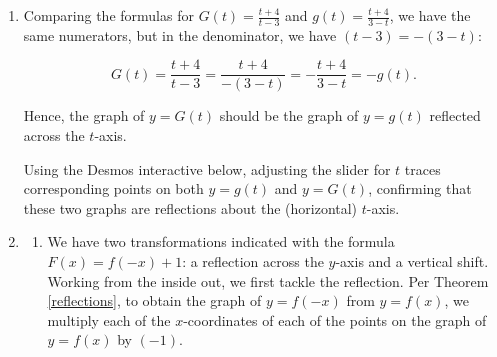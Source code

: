 \documentclass{ximera}
\begin{document}
\begin{example}
\begin{enumerate}
  Using the Desmos interactive below, we can use the slider for $s$ and observe that points on the graph of the function $t=H(s)$ are indeed reflections across the (vertical) $t$-axis of points on the graph of the function $t = h(s)$.


  \begin{center}
  \end{center}
 
 \item Comparing the formulas for $G(t) = \frac{t+4}{t-3}$ and $g(t) =\frac{t+4}{3-t}$, we have the same numerators, but in the denominator, we have $(t-3) = -(3-t)$:  
 
 \[G(t) =  \dfrac{t+4}{t-3} = \dfrac{t+4}{-(3-t)} = - \dfrac{t+4}{3-t} = -g(t). \]
 
 Hence, the graph of $y=G(t)$ should be the graph of $y=g(t)$ reflected across the $t$-axis. 

 Using the Desmos interactive below, adjusting the slider for $t$ traces corresponding points on both $y = g(t)$ and $y = G(t)$, confirming that these two graphs are reflections about the (horizontal) $t$-axis.

\begin{center}
\end{center}

 

\item
 
 \begin{enumerate}
 
 \item We have two transformations indicated with the formula $F(x) = f(-x)+1$:  a reflection across the $y$-axis and a vertical shift.  Working from the inside out, we first tackle the reflection.  Per Theorem \ref{reflections}, to obtain the graph of $y=f(-x)$ from $y=f(x)$, we multiply each of the $x$-coordinates of each of the points on the graph of $y=f(x)$ by $(-1)$.
 
 
\begin{image}
\end{image}
\end{enumerate}
\end{enumerate}
\end{example}
\end{document}
